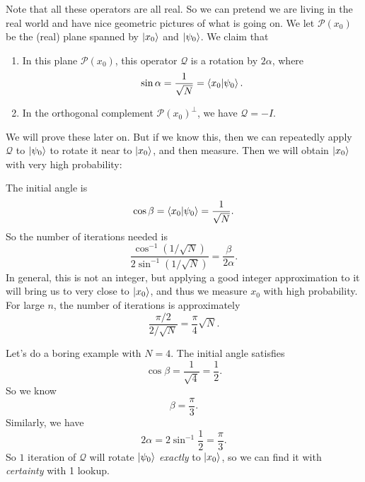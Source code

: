 Note that all these operators are all real. So we can pretend we are living in the real world and have nice geometric pictures of what is going on. We let $\mathcal{P}(x_0)$ be the (real) plane spanned by $\left\lvert x_0\right\rangle$ and $\left\lvert \psi_0\right\rangle$. We claim that
\begin{enumerate}
  \item In this plane $\mathcal{P}(x_0)$, this operator $\mathcal{Q}$ is a rotation by $2\alpha$, where
    \[
      \sin\alpha = \frac{1}{\sqrt{N}} = \left\langle x_0\middle\vert \psi_0 \right\rangle.
    \]
  \item In the orthogonal complement $\mathcal{P}(x_0)^\perp$, we have $\mathcal{Q} = -I$.
\end{enumerate}
We will prove these later on. But if we know this, then we can repeatedly apply $\mathcal{Q}$ to $\left\lvert \psi_0\right\rangle$ to rotate it near to $\left\lvert x_0\right\rangle$, and then measure. Then we will obtain $\left\lvert x_0\right\rangle$ with very high probability:
\begin{center}
\end{center}
The initial angle is
\[
  \cos \beta = \left\langle x_0\middle\vert \psi_0 \right\rangle = \frac{1}{\sqrt{N}}.
\]
So the number of iterations needed is
\[
  \frac{\cos^{-1}(1/\sqrt{N})}{2 \sin^{-1}(1/\sqrt{N})} = \frac{\beta}{2\alpha}.
\]
In general, this is not an integer, but applying a good integer approximation to it will bring us to very close to $\left\lvert x_0\right\rangle$, and thus we measure $x_0$ with high probability. For large $n$, the number of iterations is approximately
\[
  \frac{\pi/2}{2/\sqrt{N}} = \frac{\pi}{4} \sqrt{N}.
\]
\begin{eg}
  Let's do a boring example with $N = 4$. The initial angle satisfies
  \[
    \cos \beta = \frac{1}{\sqrt{4}} = \frac{1}{2}.
  \]
  So we know
  \[
    \beta = \frac{\pi}{3}.
  \]
  Similarly, we have
  \[
    2\alpha = 2 \sin^{-1}\frac{1}{2} = \frac{\pi}{3}.
  \]
  So $1$ iteration of $\mathcal{Q}$ will rotate $\left\lvert \psi_0\right\rangle$ \emph{exactly} to $\left\lvert x_0\right\rangle$, so we can find it with \emph{certainty} with 1 lookup.
\end{eg}
